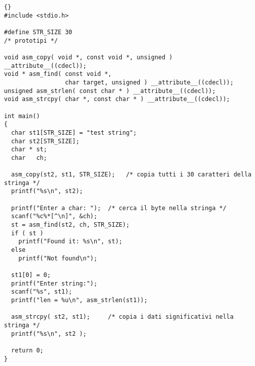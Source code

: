 \begin{lstlisting}{}
#include <stdio.h>

#define STR_SIZE 30
/* prototipi */

void asm_copy( void *, const void *, unsigned ) __attribute__((cdecl));
void * asm_find( const void *, 
                 char target, unsigned ) __attribute__((cdecl));
unsigned asm_strlen( const char * ) __attribute__((cdecl));
void asm_strcpy( char *, const char * ) __attribute__((cdecl));

int main()
{
  char st1[STR_SIZE] = "test string";
  char st2[STR_SIZE];
  char * st;
  char   ch;

  asm_copy(st2, st1, STR_SIZE);   /* copia tutti i 30 caratteri della stringa */
  printf("%s\n", st2);

  printf("Enter a char: ");  /* cerca il byte nella stringa */
  scanf("%c%*[^\n]", &ch);
  st = asm_find(st2, ch, STR_SIZE);
  if ( st )
    printf("Found it: %s\n", st);
  else
    printf("Not found\n");

  st1[0] = 0;
  printf("Enter string:");
  scanf("%s", st1);
  printf("len = %u\n", asm_strlen(st1));

  asm_strcpy( st2, st1);     /* copia i dati significativi nella stringa */
  printf("%s\n", st2 );

  return 0;
}
\end{lstlisting}













